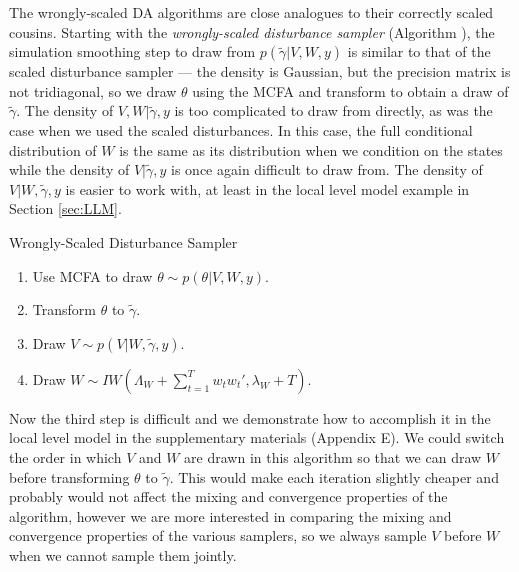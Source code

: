 \documentclass[12pt]{article}
\begin{document}
The wrongly-scaled DA algorithms are close analogues to their correctly scaled cousins. Starting with the {\it wrongly-scaled disturbance sampler} (Algorithm ), the simulation smoothing step to draw from $p(\tilde{\gamma}|V,W,y)$ is similar to that of the scaled disturbance sampler --- the density is Gaussian, but the precision matrix is not tridiagonal, so we draw $\theta$ using the MCFA and transform to obtain a draw of $\tilde{\gamma}$. The density of $V,W|\tilde{\gamma},y$ is too complicated to draw from directly, as was the case when we used the scaled disturbances. In this case, the full conditional distribution of $W$ is the same as its distribution when we condition on the states while the density of $V|\tilde{\gamma},y$ is once again difficult to draw from. The density of $V|W,\tilde{\gamma},y$ is easier to work with, at least in the local level model example in Section \ref{sec:LLM}. 
\begin{alg*}[WSD]Wrongly-Scaled Disturbance Sampler\label{alg:DLMwdist}
\begin{enumerate}
\item Use MCFA to draw $\theta \sim p(\theta|V,W,y)$.
\item Transform $\theta$ to $\tilde{\gamma}$.
\item Draw $V \sim p(V|W,\tilde{\gamma},y)$.
\item Draw $W \sim IW\left(\Lambda_W + \sum_{t=1}^Tw_tw_t',\lambda_{W} + T\right)$.
\end{enumerate}
\end{alg*}\noindent
Now the third step is difficult and we demonstrate how to accomplish it in the local level model in the supplementary materials (Appendix E). We could switch the order in which $V$ and $W$ are drawn in this algorithm so that we can draw $W$ before transforming $\theta$ to $\tilde{\gamma}$. This would make each iteration slightly cheaper and probably would not affect the mixing and convergence properties of the algorithm, however we are more interested in comparing the mixing and convergence properties of the various samplers, so we always sample $V$ before $W$ when we cannot sample them jointly.
\end{document}
